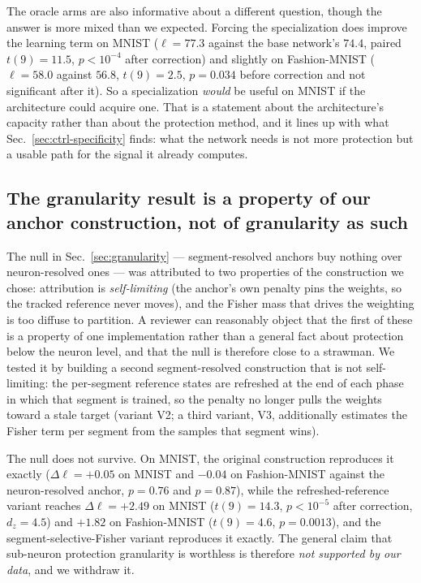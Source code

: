 \documentclass[10pt]{article}
\begin{document}
The oracle arms are also informative about a different question, though
the answer is more mixed than we expected. Forcing the specialization
does improve the learning term on MNIST ($\ell=77.3$ against the base
network's $74.4$, paired $t(9)=11.5$, $p<10^{-4}$ after correction) and
slightly on Fashion-MNIST ($\ell=58.0$ against $56.8$, $t(9)=2.5$,
$p=0.034$ before correction and not significant after it). So a
specialization \emph{would} be useful on MNIST if the architecture could
acquire one. That is a statement about the architecture's capacity rather
than about the protection method, and it lines up with what
Sec.~\ref{sec:ctrl-specificity} finds: what the network needs is not
more protection but a usable path for the signal it already computes.

\subsection{The granularity result is a property of our anchor
construction, not of granularity as such}
\label{sec:ctrl-anchor}

The null in Sec.~\ref{sec:granularity} --- segment-resolved anchors buy
nothing over neuron-resolved ones --- was attributed to two properties of
the construction we chose: attribution is \emph{self-limiting} (the
anchor's own penalty pins the weights, so the tracked reference never
moves), and the Fisher mass that drives the weighting is too diffuse to
partition. A reviewer can reasonably object that the first of these is a
property of one implementation rather than a general fact about
protection below the neuron level, and that the null is therefore close
to a strawman. We tested it by building a second segment-resolved
construction that is not self-limiting: the per-segment reference
states are refreshed at the end of each phase in which that segment is
trained, so the penalty no longer pulls the weights toward a stale
target (variant V2; a third variant, V3, additionally estimates the
Fisher term per segment from the samples that segment wins).

The null does not survive. On MNIST, the original construction reproduces
it exactly ($\Delta\ell=+0.05$ on MNIST and $-0.04$ on Fashion-MNIST
against the neuron-resolved anchor, $p=0.76$ and $p=0.87$), while the
refreshed-reference variant reaches
$\Delta\ell=+2.49$ on MNIST ($t(9)=14.3$, $p<10^{-5}$ after correction,
$d_z=4.5$) and $+1.82$ on Fashion-MNIST ($t(9)=4.6$, $p=0.0013$), and the
segment-selective-Fisher variant reproduces it exactly. The general claim that sub-neuron protection
granularity is worthless is therefore \emph{not supported by our data},
and we withdraw it.
\end{document}
